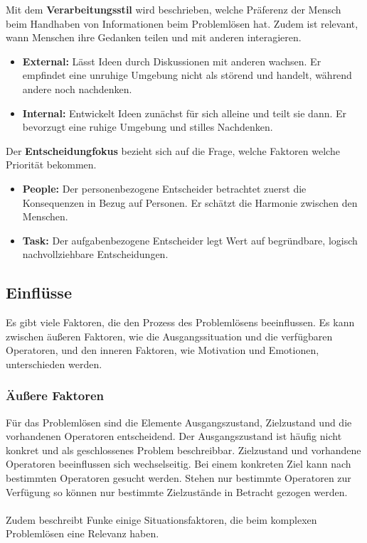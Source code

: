 Mit dem \textbf{Verarbeitungsstil} wird beschrieben, welche Präferenz der Mensch beim Handhaben von Informationen beim Problemlösen hat. Zudem ist relevant, wann Menschen ihre Gedanken teilen und mit anderen interagieren.
	\begin{itemize}
	\item \textbf{External:} Lässt Ideen durch Diskussionen mit anderen wachsen. Er empfindet eine unruhige Umgebung nicht als störend und handelt, während andere noch nachdenken.
	\item \textbf{Internal:} Entwickelt Ideen zunächst für sich alleine und teilt sie dann. Er bevorzugt eine ruhige Umgebung und stilles Nachdenken.
	\end{itemize}
	
Der \textbf{Entscheidungfokus} bezieht sich auf die Frage, welche Faktoren welche Priorität bekommen.
	\begin{itemize}
	\item \textbf{People:} Der personenbezogene Entscheider betrachtet zuerst die Konsequenzen in Bezug auf Personen. Er schätzt die Harmonie zwischen den Menschen.
	\item \textbf{Task:} Der aufgabenbezogene Entscheider legt Wert auf begründbare, logisch nachvollziehbare Entscheidungen.
	\end{itemize}

\subsection{Einflüsse}
Es gibt viele Faktoren, die den Prozess des Problemlösens beeinflussen. Es kann zwischen äußeren Faktoren, wie die Ausgangssituation und die verfügbaren Operatoren, und den inneren Faktoren, wie Motivation und Emotionen, unterschieden werden.

\subsubsection*{Äußere Faktoren}
Für das Problemlösen sind die Elemente Ausgangszustand, Zielzustand und die vorhandenen Operatoren entscheidend. Der Ausgangszustand ist häufig nicht konkret und als geschlossenes Problem beschreibbar. Zielzustand und vorhandene Operatoren beeinflussen sich wechselseitig. Bei einem konkreten Ziel kann nach bestimmten Operatoren gesucht werden. Stehen nur bestimmte Operatoren zur Verfügung so können nur bestimmte Zielzustände in Betracht gezogen werden. \cite{Funke2015}
\\ \\
Zudem beschreibt Funke \cite{Funke2015} einige Situationsfaktoren, die beim komplexen Problemlösen eine Relevanz haben.

